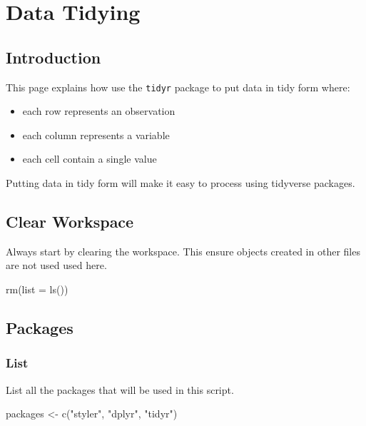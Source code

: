 \documentclass[
  letterpaper,
  DIV=11,
  numbers=noendperiod]{scrreprt}
\newenvironment{Shaded}{\begin{snugshade}}{\end{snugshade}}
\newcommand{\AttributeTok}[1]{\textcolor[rgb]{0.40,0.45,0.13}{#1}}
\newcommand{\FunctionTok}[1]{\textcolor[rgb]{0.28,0.35,0.67}{#1}}
\newcommand{\NormalTok}[1]{\textcolor[rgb]{0.00,0.23,0.31}{#1}}
\newcommand{\OtherTok}[1]{\textcolor[rgb]{0.00,0.23,0.31}{#1}}
\newcommand{\StringTok}[1]{\textcolor[rgb]{0.13,0.47,0.30}{#1}}
\providecommand{\tightlist}{%
  \setlength{\itemsep}{0pt}\setlength{\parskip}{0pt}}\usepackage{longtable,booktabs,array}
\begin{document}
\chapter{Data Tidying}\label{data-tidying}

\section{Introduction}\label{introduction-4}

This page explains how use the \texttt{tidyr} package to put data in
tidy form where:

\begin{itemize}
\tightlist
\item
  each row represents an observation
\item
  each column represents a variable
\item
  each cell contain a single value
\end{itemize}

Putting data in tidy form will make it easy to process using tidyverse
packages.

\section{Clear Workspace}\label{clear-workspace-5}

Always start by clearing the workspace. This ensure objects created in
other files are not used used here.

\begin{Shaded}
\begin{Highlighting}[]
\FunctionTok{rm}\NormalTok{(}\AttributeTok{list =} \FunctionTok{ls}\NormalTok{())}
\end{Highlighting}
\end{Shaded}

\section{Packages}\label{sec-packages}

\subsection{List}\label{list-5}

List all the packages that will be used in this script.

\begin{Shaded}
\begin{Highlighting}[]
\NormalTok{packages }\OtherTok{\textless{}{-}} \FunctionTok{c}\NormalTok{(}\StringTok{"styler"}\NormalTok{, }\StringTok{"dplyr"}\NormalTok{, }\StringTok{"tidyr"}\NormalTok{)}
\end{Highlighting}
\end{Shaded}
\end{document}

